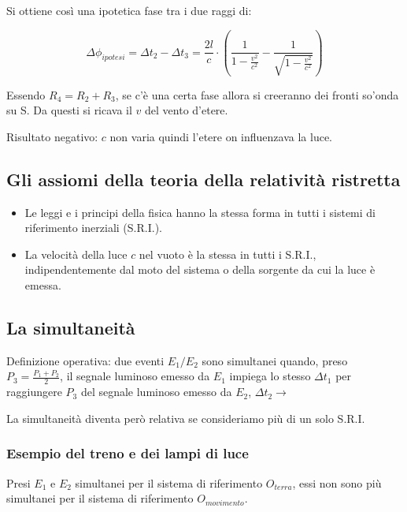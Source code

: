 Si ottiene così una ipotetica fase tra i due raggi di:

\begin{equation*}
    \Delta \phi_{ipotesi} = \Delta t_2 - \Delta t_3 = \frac{2l}{c} \cdot \left( \frac{1}{1-\frac{v^2}{c^2}} - \frac{1}{\sqrt{1-\frac{v^2}{c^2}}} \right)
\end{equation*}

Essendo $R_4 = R_2 + R_3$, se c'è una certa fase allora si creeranno dei fronti so'onda su S.
Da questi si ricava il $v$ del vento d'etere.

Risultato negativo: $c$ non varia quindi l'etere on influenzava la luce.

\subsection{Gli assiomi della teoria della relatività ristretta}

\begin{itemize}
    \item Le leggi e i principi della fisica hanno la stessa forma in tutti i sistemi di riferimento inerziali (S.R.I.).
    \item La velocità della luce $c$ nel vuoto è la stessa in tutti i S.R.I., indipendentemente dal moto del sistema o della sorgente da cui la luce è emessa.
\end{itemize}

\subsection{La simultaneità}

Definizione operativa: due eventi $E_1 / E_2$ sono simultanei quando, preso $P_3 = \frac{P_1 + P_2}{2}$, il segnale luminoso emesso da $E_1$ impiega lo stesso $\Delta t_1$ per raggiungere $P_3$ del segnale luminoso emesso da $E_2$, $\Delta t_2 \rightarrow $


La simultaneità diventa però relativa se consideriamo più di un solo S.R.I.

\subsubsection{Esempio del treno e dei lampi di luce}

Presi $E_1$ e $E_2$  simultanei per il sistema di riferimento $O_{terra}$, essi non sono più simultanei per il sistema di riferimento $O_{movimento}$.

